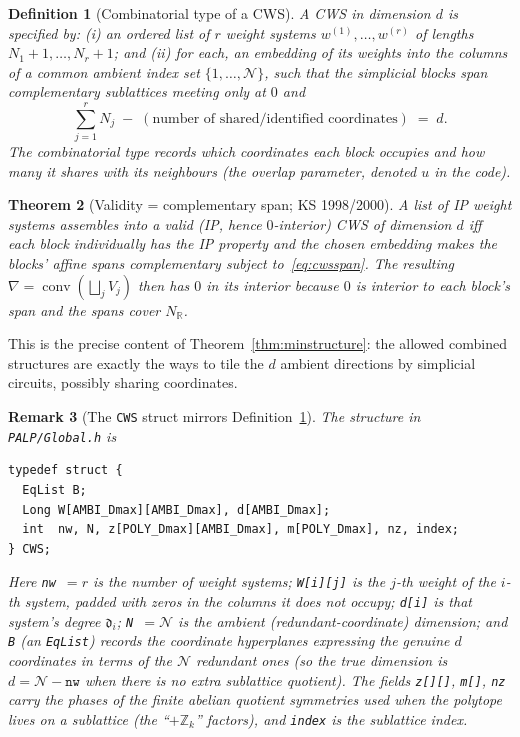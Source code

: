 \documentclass{amsart}
\newtheorem{theorem}{Theorem}[section]
\newtheorem{definition}[theorem]{Definition}
\newtheorem{remark}[theorem]{Remark}
\begin{document}
\begin{definition}[Combinatorial type of a CWS]\label{def:cwstype}
A CWS in dimension $d$ is specified by: (i) an ordered list of $r$ weight
systems $w^{(1)},\dots,w^{(r)}$ of lengths $N_1{+}1,\dots,N_r{+}1$; and
(ii) for each, an \emph{embedding} of its weights into the columns of a
common ambient index set $\{1,\dots,\mathcal N\}$, such that the simplicial
blocks span \emph{complementary} sublattices meeting only at $0$ and
\begin{equation}\label{eq:cwsspan}
  \sum_{j=1}^{r} N_j \;-\; (\text{number of shared/identified coordinates})
  \;=\; d .
\end{equation}
The \emph{combinatorial type} records which coordinates each block occupies
and how many it shares with its neighbours (the overlap parameter, denoted
$u$ in the code).
\end{definition}

\begin{theorem}[Validity = complementary span; KS 1998/2000]
\label{thm:cwsvalid}
A list of IP weight systems assembles into a valid (IP, hence
$0$-interior) CWS of dimension $d$ iff each block individually has the IP
property and the chosen embedding makes the blocks' affine spans
complementary subject to~\eqref{eq:cwsspan}. The resulting
$\nabla=\operatorname{conv}(\bigsqcup_j V_j)$ then has $0$ in its interior
because $0$ is interior to each block's span and the spans cover
$N_{\mathbb{R}}$.
\end{theorem}

This is the precise content of Theorem~\ref{thm:minstructure}: the allowed
combined structures are exactly the ways to tile the $d$ ambient directions
by simplicial circuits, possibly sharing coordinates.

\begin{remark}[The \texttt{CWS} struct mirrors
Definition~\ref{def:cwstype}]\label{rmk:cwsstruct}
The structure in \texttt{PALP/Global.h} is
\begin{verbatim}
typedef struct {
  EqList B;
  Long W[AMBI_Dmax][AMBI_Dmax], d[AMBI_Dmax];
  int  nw, N, z[POLY_Dmax][AMBI_Dmax], m[POLY_Dmax], nz, index;
} CWS;
\end{verbatim}
Here \texttt{nw}~$=r$ is the number of weight systems; \texttt{W[i][j]} is
the $j$-th weight of the $i$-th system, padded with zeros in the columns it
does \emph{not} occupy; \texttt{d[i]} is that system's degree
$\mathfrak{d}_i$; \texttt{N}~$=\mathcal N$ is the ambient
(redundant-coordinate) dimension; and \texttt{B} (an \texttt{EqList})
records the coordinate hyperplanes expressing the genuine $d$ coordinates in
terms of the $\mathcal N$ redundant ones (so the true dimension is
$d = \mathcal N - \texttt{nw}$ when there is no extra sublattice quotient).
The fields \texttt{z[][]}, \texttt{m[]}, \texttt{nz} carry the phases of the
finite abelian quotient symmetries used when the polytope lives on a
\emph{sublattice} (the ``$+\mathbb{Z}_k$'' factors), and \texttt{index} is
the sublattice index.
\end{remark}
\end{document}
